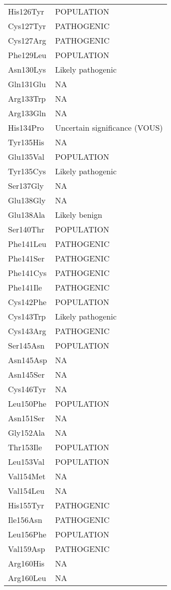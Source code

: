 \begin{longtable}[l]{l|l}
	His126Tyr & POPULATION \\
	Cys127Tyr & PATHOGENIC \\
	Cys127Arg & PATHOGENIC \\
	Phe129Leu & POPULATION \\
	Asn130Lys & Likely pathogenic \\
	Gln131Glu & NA \\
	Arg133Trp & NA \\
	Arg133Gln & NA \\
	His134Pro & Uncertain significance (VOUS) \\
	Tyr135His & NA \\
	Glu135Val & POPULATION \\
	Tyr135Cys & Likely pathogenic \\
	Ser137Gly & NA \\
	Glu138Gly & NA \\
	Glu138Ala & Likely benign \\
	Ser140Thr & POPULATION \\
	Phe141Leu & PATHOGENIC \\
	Phe141Ser & PATHOGENIC \\
	Phe141Cys & PATHOGENIC \\
	Phe141Ile & PATHOGENIC \\
	Cys142Phe & POPULATION \\
	Cys143Trp & Likely pathogenic \\
	Cys143Arg & PATHOGENIC \\
	Ser145Asn & POPULATION \\
	Asn145Asp & NA \\
	Asn145Ser & NA \\
	Cys146Tyr & NA \\
	Leu150Phe & POPULATION \\
	Asn151Ser & NA \\
	Gly152Ala & NA \\
	Thr153Ile & POPULATION \\
	Leu153Val & POPULATION \\
	Val154Met & NA \\
	Val154Leu & NA \\
	His155Tyr & PATHOGENIC \\
	Ile156Asn & PATHOGENIC \\
	Leu156Phe & POPULATION \\
	Val159Asp & PATHOGENIC \\
	Arg160His & NA \\
	Arg160Leu & NA \\

\end{longtable}
